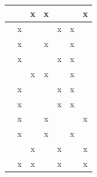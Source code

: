 \begin{table}
\begin{tabular}{l|c|c|l|c|c|c|}
\multicolumn{1}{|l|}{\cite{Parra-Gonzalez2012}} & \multicolumn{1}{l|}{} & x                     & \multicolumn{1}{c|}{x}        & \multicolumn{1}{l|}{}  & \multicolumn{1}{l|}{} & x                     \\ \hline
\multicolumn{1}{|l|}{\cite{Arleo2013}}          & x                     & \multicolumn{1}{l|}{} &                               & x                      & x                     & \multicolumn{1}{l|}{} \\ \hline
\multicolumn{1}{|l|}{\cite{Jiang2013}}          & x                     & \multicolumn{1}{l|}{} & \multicolumn{1}{c|}{x}        & \multicolumn{1}{l|}{}  & x                     & \multicolumn{1}{l|}{} \\ \hline
\multicolumn{1}{|l|}{\cite{Machado2013}}        & x                     & \multicolumn{1}{l|}{} &                               & x                      & x                     & \multicolumn{1}{l|}{} \\ \hline
\multicolumn{1}{|l|}{\cite{Mericli2013}}        & \multicolumn{1}{l|}{} & x                     & \multicolumn{1}{c|}{x}        & \multicolumn{1}{l|}{}  & x                     & \multicolumn{1}{l|}{} \\ \hline
\multicolumn{1}{|l|}{\cite{Orsag2013}}          & x                     & \multicolumn{1}{l|}{} &                               & x                      & x                     & \multicolumn{1}{l|}{} \\ \hline
\multicolumn{1}{|l|}{\cite{Kim2013}}            & x                     & \multicolumn{1}{l|}{} &                               & x                      & x                     & \multicolumn{1}{l|}{} \\ \hline
\multicolumn{1}{|l|}{\cite{Wada2013}}           & x                     & \multicolumn{1}{l|}{} & \multicolumn{1}{c|}{x}        &                        & \multicolumn{1}{l|}{} & x                     \\ \hline
\multicolumn{1}{|l|}{\cite{Hekmatfar2014}}      & x                     & \multicolumn{1}{l|}{} & \multicolumn{1}{c|}{x}        & \multicolumn{1}{l|}{}  & x                     & \multicolumn{1}{l|}{} \\ \hline
\multicolumn{1}{|l|}{\cite{Magariyama2014}}     & \multicolumn{1}{l|}{} & x                     &                               & x                      & \multicolumn{1}{l|}{} & x                     \\ \hline
\multicolumn{1}{|l|}{\cite{Maghsoud2014}}       & x                     & x                     &                               & x                      & \multicolumn{1}{l|}{} & x                     \\ \hline

\end{tabular}
\end{table}
